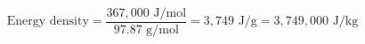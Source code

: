 \documentclass[preview]{standalone}
\begin{document}
\[\text{Energy density} = \frac{367{,}000 \text{ J/mol}}{97.87 \text{ g/mol}} = 3{,}749 \text{ J/g} = 3{,}749{,}000 \text{ J/kg}\]
\end{document}
